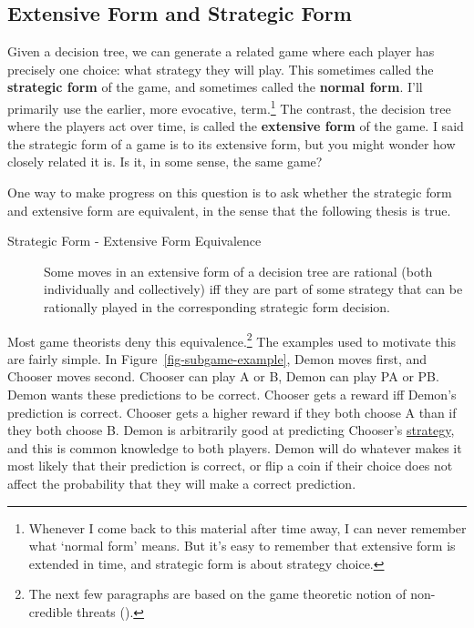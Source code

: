 \documentclass[
  12pt,
  letterpaper,
  DIV=11,
  numbers=noendperiod]{scrreprt}
\begin{document}
\subsection{Extensive Form and Strategic
Form}\label{sec-equivalence-intro}

Given a decision tree, we can generate a related game where each player
has precisely one choice: what strategy they will play. This sometimes
called the \textbf{strategic form} of the game, and sometimes called the
\textbf{normal form}. I'll primarily use the earlier, more evocative,
term.\footnote{Whenever I come back to this material after time away, I
  can never remember what `normal form' means. But it's easy to remember
  that extensive form is extended in time, and strategic form is about
  strategy choice.} The contrast, the decision tree where the players
act over time, is called the \textbf{extensive form} of the game. I said
the strategic form of a game is to its extensive form, but you might
wonder how closely related it is. Is it, in some sense, the same game?

One way to make progress on this question is to ask whether the
strategic form and extensive form are equivalent, in the sense that the
following thesis is true.

\begin{description}
\item[Strategic Form - Extensive Form Equivalence]
Some moves in an extensive form of a decision tree are rational (both
individually and collectively) iff they are part of some strategy that
can be rationally played in the corresponding strategic form decision.
\end{description}

Most game theorists deny this equivalence.\footnote{The next few
  paragraphs are based on the game theoretic notion of non-credible
  threats ().} The
examples used to motivate this are fairly simple. In
Figure~\ref{fig-subgame-example}, Demon moves first, and Chooser moves
second. Chooser can play A or B, Demon can play PA or PB. Demon wants
these predictions to be correct. Chooser gets a reward iff Demon's
prediction is correct. Chooser gets a higher reward if they both choose
A than if they both choose B. Demon is arbitrarily good at predicting
Chooser's \hyperref[sec-strategies]{strategy}, and this is common
knowledge to both players. Demon will do whatever makes it most likely
that their prediction is correct, or flip a coin if their choice does
not affect the probability that they will make a correct prediction.
\end{document}
